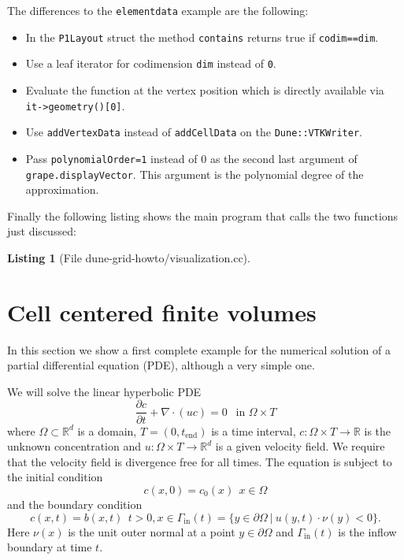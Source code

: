 \documentclass[11pt,a4paper,headinclude,footinclude,DIV16,headings=normal]{scrreprt}
\newtheorem{lst}{Listing}
\begin{document}
The differences to the \lstinline!elementdata! example are the
following:
\begin{itemize}
\item In the \lstinline!P1Layout! struct the method
  \lstinline!contains! returns true if \lstinline!codim==dim!.
\item Use a leaf iterator for codimension \lstinline!dim! instead of
  \lstinline!0!.
\item Evaluate the function at the vertex position which is directly
  available via \lstinline!it->geometry()[0]!.
\item Use \lstinline!addVertexData! instead of \lstinline!addCellData!
  on the \lstinline!Dune::VTKWriter!.
\item Pass \lstinline!polynomialOrder=1! instead of 0 as
the second last argument of \lstinline!grape.displayVector!. This argument is the polynomial
  degree of the approximation.
\end{itemize}

Finally the following listing shows the main program that calls the
two functions just discussed:

\begin{lst}[File dune-grid-howto/visualization.cc] \mbox{}
\nopagebreak

\end{lst}

\section{Cell centered finite volumes}
\label{Sec:CellCenteredFV}

In this section we show a first complete example for the numerical
solution of a partial differential equation (PDE), although a very simple
one.

We will solve the linear hyperbolic PDE
\begin{equation}
\frac{\partial c}{\partial t} + \nabla\cdot (uc) = 0 \ \ \text{ in
  $\Omega\times T$}
\label{Eq:TransportEquation}
\end{equation}
where $\Omega\subset\mathbb{R}^d$ is a domain, $T=(0,t_{\text{end}})$
is a time interval,
$c:\Omega\times T\to\mathbb{R}$ is the unknown concentration and
$u:\Omega\times T\to\mathbb{R}^d$ is a given velocity field. We
require that the velocity field is divergence free for all times.
The equation is subject to the initial condition
\begin{equation}
c(x,0) = c_0(x) \ \ x\in\Omega
\end{equation}
and the boundary condition
\begin{equation}
c(x,t) = b(x,t) \ \ t>0, x\in\Gamma_{\text{in}}(t)=\{y\in\partial\Omega\
|\ u(y,t)\cdot\nu(y)<0\}.
\end{equation}
Here $\nu(x)$ is the unit outer normal at a point $y\in\partial\Omega$
and $\Gamma_{\text{in}}(t)$ is the inflow boundary at time $t$.
\end{document}
